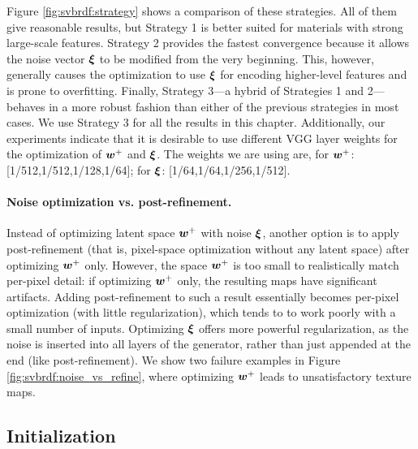 

Figure \ref{fig:svbrdf:strategy} shows a comparison of these strategies.
All of them give reasonable results, but Strategy 1 is better suited for materials with strong large-scale features.
Strategy 2 provides the fastest convergence because it allows the noise vector $\bm{\xi}$ to be modified from the very beginning.
This, however, generally causes the optimization to use $\bm{\xi}$ for encoding higher-level features and is prone to overfitting.
Finally, Strategy 3---a hybrid of Strategies 1 and 2---behaves in a more robust fashion than either of the previous strategies in most cases.
We use Strategy 3 for all the results in this chapter.
Additionally, our experiments indicate that it is desirable to use different VGG layer weights for the optimization of $\bm{w}^+$ and $\bm{\xi}$. The weights we are using are, for $\bm{w}^+$: [1/512,1/512,1/128,1/64]; for $\bm{\xi}$: [1/64,1/64,1/256,1/512].




\paragraph{Noise optimization vs. post-refinement.}
\label{ssec:post-refine}
Instead of optimizing latent space $\bm{w}^+$ with noise $\bm{\xi}$, another option is to apply post-refinement (that is, pixel-space optimization without any latent space) after optimizing $\bm{w}^+$ only. However, the space $\bm{w}^+$ is too small to realistically match per-pixel detail: if optimizing $\bm{w}^+$ only, the resulting maps have significant artifacts. Adding post-refinement to such a result essentially becomes per-pixel optimization (with little regularization), which tends to to work poorly with a small number of inputs. Optimizing $\bm{\xi}$ offers more powerful regularization, as the noise is inserted into all layers of the generator, rather than just appended at the end (like post-refinement). We show two failure examples in Figure \ref{fig:svbrdf:noise_vs_refine}, where optimizing $\bm{w}^+$ leads to unsatisfactory texture maps.


\subsection{Initialization}
\label{ssec:init}



